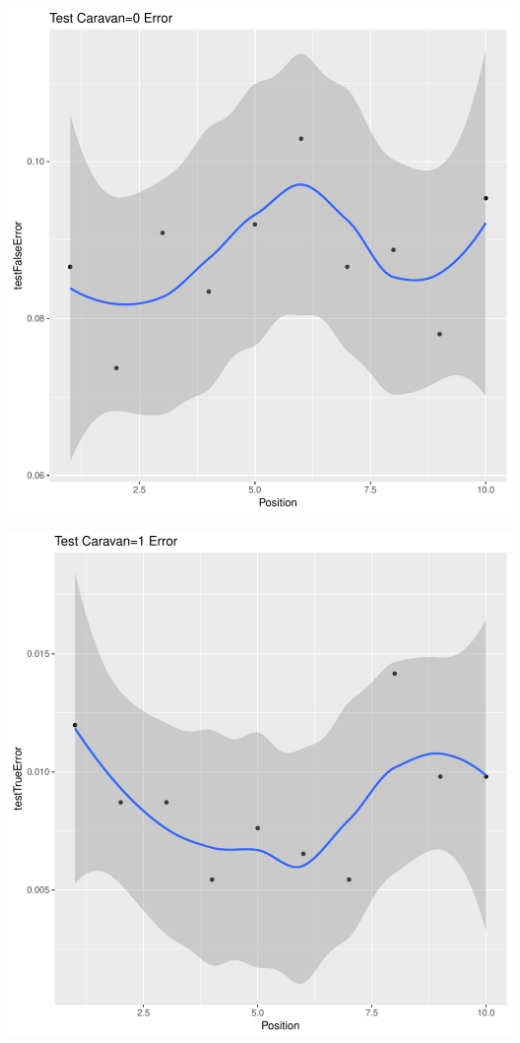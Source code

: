 \documentclass{article}\usepackage[]{graphicx}\usepackage[]{color}
\makeatletter
\def\maxwidth{ %
  \ifdim\Gin@nat@width>\linewidth
    \linewidth
  \else
    \Gin@nat@width
  \fi
}
\newenvironment{kframe}{%
 \def\at@end@of@kframe{}%
 \ifinner\ifhmode%
  \def\at@end@of@kframe{\end{minipage}}%
  \begin{minipage}{\columnwidth}%
 \fi\fi%
 \def\FrameCommand##1{\hskip\@totalleftmargin \hskip-\fboxsep
 \colorbox{shadecolor}{##1}\hskip-\fboxsep
     \hskip-\linewidth \hskip-\@totalleftmargin \hskip\columnwidth}%
 \MakeFramed {\advance\hsize-\width
   \@totalleftmargin\z@ \linewidth\hsize
   \@setminipage}}%
 {\par\unskip\endMakeFramed%
 \at@end@of@kframe}
\newenvironment{knitrout}{}{} %
\makeatother
\begin{document}
\begin{knitrout}
\begin{kframe}
{\ttfamily\noindent\itshape\color{messagecolor}{\#\# `geom\_smooth()` using method = 'loess'}}\end{kframe}
\includegraphics[width=\maxwidth]{figure/unnamed-chunk-43-6} 
\begin{kframe}

{\ttfamily\noindent\itshape\color{messagecolor}{\#\# `geom\_smooth()` using method = 'loess'}}\end{kframe}
\includegraphics[width=\maxwidth]{figure/unnamed-chunk-43-7} 
\begin{kframe}


\end{kframe}
\end{knitrout}
\end{document}
